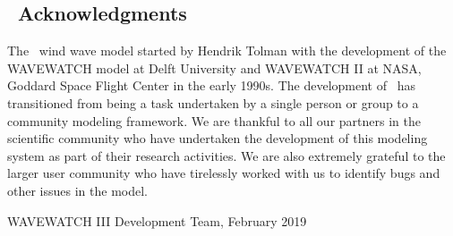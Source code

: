 \vssub
\subsection{~Acknowledgments}
\vssub

The \ws\ wind wave model started by Hendrik Tolman with the development of the WAVEWATCH model at Delft University and WAVEWATCH II at NASA, Goddard Space Flight Center in the early 1990s.  
The development of \ws\ has transitioned from being a task undertaken by a single person or group to a community modeling framework. We are thankful to all our partners in the scientific community who have undertaken the development of this modeling system as part of their research activities. We are also extremely grateful to the larger user community who have tirelessly worked with us to identify bugs and other issues in the model. 

\vspace{\baselineskip}
\vspace{\baselineskip} 
\strut \hfill WAVEWATCH III Development Team, February 2019

